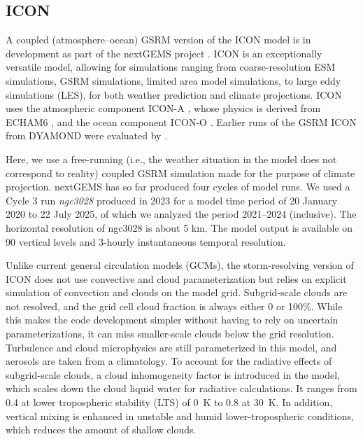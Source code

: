 \documentclass[draft]{agujournal2019}
\begin{document}
\subsection{ICON}
\label{sec:icon}

A coupled (atmosphere--ocean) GSRM version of the ICON model is in development as part of the nextGEMS project \cite{hohenegger2023}. ICON is an exceptionally versatile model, allowing for simulations ranging from coarse-resolution ESM simulations, GSRM simulations, limited area model simulations, to large eddy simulations (LES), for both weather prediction and climate projections. ICON uses the atmospheric component ICON-A \cite{giorgetta2018}, whose physics is derived from ECHAM6 \cite{stevens2013}, and the ocean component ICON-O \cite{korn2022}. Earlier runs of the GSRM ICON from DYAMOND were evaluated by .

Here, we use a free-running (i.e., the weather situation in the model does not correspond to reality) coupled GSRM simulation made for the purpose of climate projection. nextGEMS has so far produced four cycles of model runs. We used a Cycle 3 run \emph{ngc3028} produced in 2023 \cite{nextgems2023a,nextgems2023b} for a model time period of 20 January 2020 to 22 July 2025, of which we analyzed the period 2021--2024 (inclusive). The horizontal resolution of ngc3028 is about 5 km. The model output is available on 90 vertical levels and 3-hourly instantaneous temporal resolution.

Unlike current general circulation models (GCMs), the storm-resolving version of ICON does not use convective and cloud parameterization but relies on explicit simulation of convection and clouds on the model grid. Subgrid-scale clouds are not resolved, and the grid cell cloud fraction is always either 0 or 100\%. While this makes the code development simpler without having to rely on uncertain parameterizations, it can miss smaller-scale clouds below the grid resolution. Turbulence and cloud microphysics are still parameterized in this model, and aerosols are taken from a climatology. To account for the radiative effects of subgrid-scale clouds, a cloud inhomogeneity factor is introduced in the model, which scales down the cloud liquid water for radiative calculations. It ranges from 0.4 at lower tropospheric stability (LTS) of 0~K to 0.8 at 30~K. In addition, vertical mixing is enhanced in unstable and humid lower-tropospheric conditions, which reduces the amount of shallow clouds.
\end{document}
